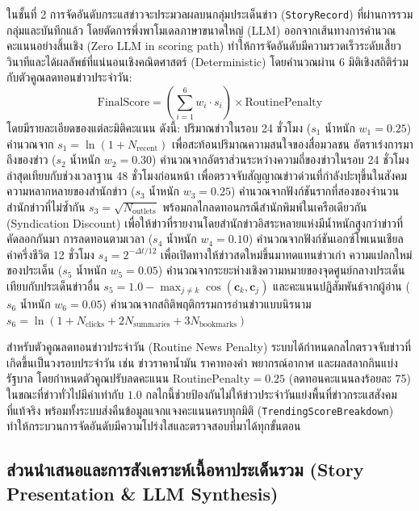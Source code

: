 ในชั้นที่ 2 การจัดอันดับกระแสข่าวจะประมวลผลบนกลุ่มประเด็นข่าว (\texttt{StoryRecord}) ที่ผ่านการรวมกลุ่มและบันทึกแล้ว โดยตัดการพึ่งพาโมเดลภาษาขนาดใหญ่ (LLM) ออกจากเส้นทางการคำนวณคะแนนอย่างสิ้นเชิง (Zero LLM in scoring path) ทำให้การจัดอันดับมีความรวดเร็วระดับเสี้ยววินาทีและได้ผลลัพธ์ที่แน่นอนเชิงคณิตศาสตร์ (Deterministic) โดยคำนวณผ่าน 6 มิติเชิงสถิติร่วมกับตัวคูณลดทอนข่าวประจำวัน:
\begin{equation}
\text{FinalScore} = \left( \sum_{i=1}^6 w_i \cdot s_i \right) \times \text{RoutinePenalty}
\end{equation}
โดยมีรายละเอียดของแต่ละมิติคะแนน ดังนี้:
ปริมาณข่าวในรอบ 24 ชั่วโมง ($s_1$ น้ำหนัก $w_1 = 0.25$) คำนวณจาก $s_1 = \ln(1 + N_{\text{recent}})$ เพื่อสะท้อนปริมาณความสนใจของสื่อมวลชน
อัตราเร่งการมาถึงของข่าว ($s_2$ น้ำหนัก $w_2 = 0.30$) คำนวณจากอัตราส่วนระหว่างความถี่ของข่าวในรอบ 24 ชั่วโมงล่าสุดเทียบกับช่วงเวลาฐาน 48 ชั่วโมงก่อนหน้า เพื่อตรวจจับสัญญาณข่าวด่วนที่กำลังปะทุขึ้นในสังคม
ความหลากหลายของสำนักข่าว ($s_3$ น้ำหนัก $w_3 = 0.25$) คำนวณจากฟังก์ชันรากที่สองของจำนวนสำนักข่าวที่ไม่ซ้ำกัน $s_3 = \sqrt{N_{\text{outlets}}}$ พร้อมกลไกลดทอนกรณีสำนักพิมพ์ในเครือเดียวกัน (Syndication Discount) เพื่อให้ข่าวที่รายงานโดยสำนักข่าวอิสระหลายแห่งมีน้ำหนักสูงกว่าข่าวที่คัดลอกกันมา
การลดทอนตามเวลา ($s_4$ น้ำหนัก $w_4 = 0.10$) คำนวณจากฟังก์ชันเอกซ์โพเนนเชียลค่าครึ่งชีวิต 12 ชั่วโมง $s_4 = 2^{-\Delta t / 12}$ เพื่อเปิดทางให้ข่าวสดใหม่ขึ้นมาทดแทนข่าวเก่า
ความแปลกใหม่ของประเด็น ($s_5$ น้ำหนัก $w_5 = 0.05$) คำนวณจากระยะห่างเชิงความหมายของจุดศูนย์กลางประเด็นเทียบกับประเด็นข่าวอื่น $s_5 = 1.0 - \max_{j \ne k} \cos(\mathbf{c}_k, \mathbf{c}_j)$
และคะแนนปฏิสัมพันธ์จากผู้อ่าน ($s_6$ น้ำหนัก $w_6 = 0.05$) คำนวณจากสถิติพฤติกรรมการอ่านข่าวแบบนิรนาม $s_6 = \ln(1 + N_{\text{clicks}} + 2 N_{\text{summaries}} + 3 N_{\text{bookmarks}})$

สำหรับตัวคูณลดทอนข่าวประจำวัน (Routine News Penalty) ระบบได้กำหนดกลไกตรวจจับข่าวที่เกิดขึ้นเป็นวงรอบประจำวัน เช่น ข่าวราคาน้ำมัน ราคาทองคำ พยากรณ์อากาศ และผลสลากกินแบ่งรัฐบาล โดยกำหนดตัวคูณปรับลดคะแนน $\text{RoutinePenalty} = 0.25$ (ลดทอนคะแนนลงร้อยละ 75) ในขณะที่ข่าวทั่วไปมีค่าเท่ากับ $1.0$ กลไกนี้ช่วยป้องกันไม่ให้ข่าวประจำวันแย่งพื้นที่ข่าวกระแสสังคมที่แท้จริง พร้อมทั้งระบบส่งคืนข้อมูลแจกแจงคะแนนครบทุกมิติ (\texttt{TrendingScoreBreakdown}) ทำให้กระบวนการจัดอันดับมีความโปร่งใสและตรวจสอบที่มาได้ทุกขั้นตอน

\subsection{ส่วนนำเสนอและการสังเคราะห์เนื้อหาประเด็นรวม (Story Presentation \& LLM Synthesis)}

